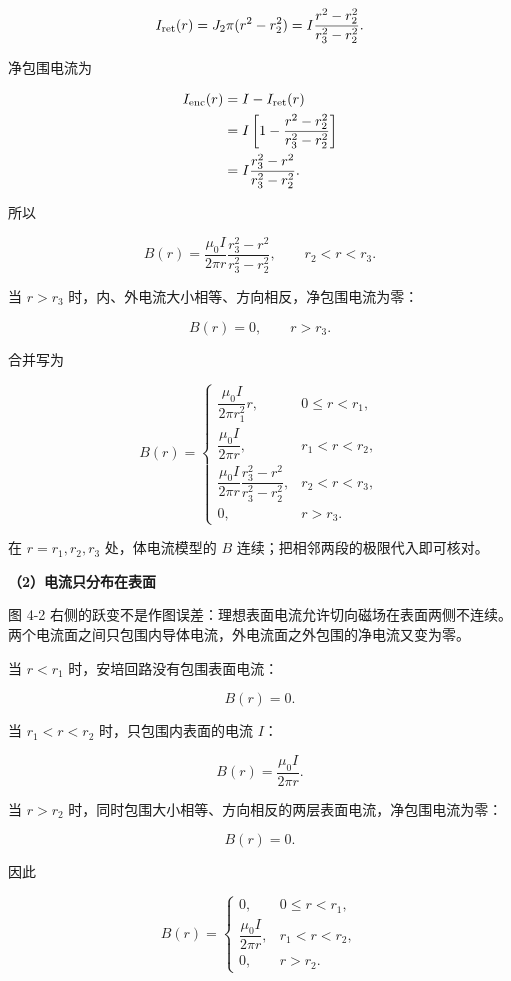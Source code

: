 \documentclass[12pt,a4paper,UTF8]{ctexart}
\begin{document}
\[I_{\rm ret}(r)
=J_2\pi(r^2-r_2^2)
=I\frac{r^2-r_2^2}{r_3^2-r_2^2}.\]

净包围电流为

\[\begin{aligned}
I_{\rm enc}(r)
&=I-I_{\rm ret}(r)\\
&=I\left[1-\frac{r^2-r_2^2}{r_3^2-r_2^2}\right]\\
&=I\frac{r_3^2-r^2}{r_3^2-r_2^2}.
\end{aligned}\]

所以

\[B(r)=\frac{\mu_0I}{2\pi r}
\frac{r_3^2-r^2}{r_3^2-r_2^2},\qquad r_2<r<r_3. \tag{38}\]

当 \(r>r_3\) 时，内、外电流大小相等、方向相反，净包围电流为零：

\[B(r)=0,\qquad r>r_3. \tag{39}\]

合并写为

\[\boxed{
B(r)=
\begin{cases}
\dfrac{\mu_0I}{2\pi r_1^2}r,&0\le r<r_1,\\[6pt]
\dfrac{\mu_0I}{2\pi r},&r_1<r<r_2,\\[6pt]
\dfrac{\mu_0I}{2\pi r}\dfrac{r_3^2-r^2}{r_3^2-r_2^2},&r_2<r<r_3,\\[8pt]
0,&r>r_3.
\end{cases}}
\tag{40}\]

在 \(r=r_1,r_2,r_3\) 处，体电流模型的 \(B\)
连续；把相邻两段的极限代入即可核对。

\textbf{（2）电流只分布在表面}

图 4-2
右侧的跃变不是作图误差：理想表面电流允许切向磁场在表面两侧不连续。两个电流面之间只包围内导体电流，外电流面之外包围的净电流又变为零。

当 \(r<r_1\) 时，安培回路没有包围表面电流：

\[B(r)=0.\]

当 \(r_1<r<r_2\) 时，只包围内表面的电流 \(I\)：

\[B(r)=\frac{\mu_0I}{2\pi r}.\]

当 \(r>r_2\)
时，同时包围大小相等、方向相反的两层表面电流，净包围电流为零：

\[B(r)=0.\]

因此

\[\boxed{
B(r)=
\begin{cases}
0,&0\le r<r_1,\\[4pt]
\dfrac{\mu_0I}{2\pi r},&r_1<r<r_2,\\[6pt]
0,&r>r_2.
\end{cases}}
\tag{41}\]
\end{document}
